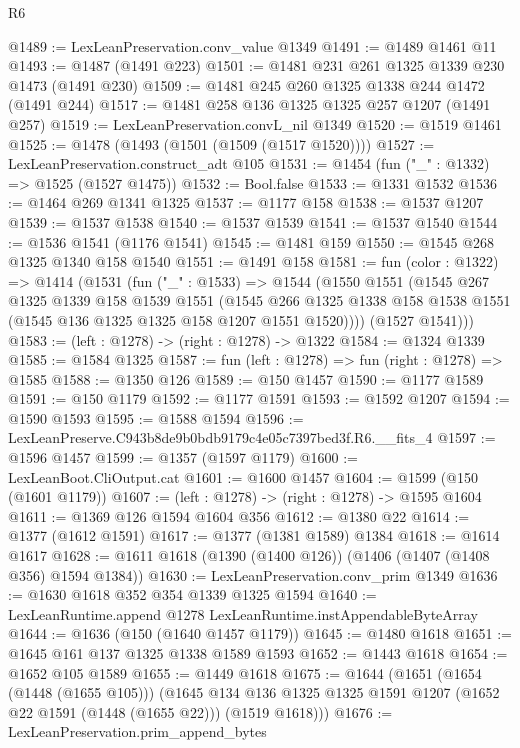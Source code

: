\begin{lexlean}{R6}
\begin{coremodule}
@1489 := LexLeanPreservation.conv_value @1349
@1491 := @1489 @1461 @11
@1493 := @1487 (@1491 @223)
@1501 := @1481 @231 @261 @1325 @1339 @230 @1473 (@1491 @230)
@1509 := @1481 @245 @260 @1325 @1338 @244 @1472 (@1491 @244)
@1517 := @1481 @258 @136 @1325 @1325 @257 @1207 (@1491 @257)
@1519 := LexLeanPreservation.convL_nil @1349
@1520 := @1519 @1461
@1525 := @1478 (@1493 (@1501 (@1509 (@1517 @1520))))
@1527 := LexLeanPreservation.construct_adt @105
@1531 := @1454 (fun ("_" : @1332) => @1525 (@1527 @1475))
@1532 := Bool.false
@1533 := @1331 @1532
@1536 := @1464 @269 @1341 @1325
@1537 := @1177 @158
@1538 := @1537 @1207
@1539 := @1537 @1538
@1540 := @1537 @1539
@1541 := @1537 @1540
@1544 := @1536 @1541 (@1176 @1541)
@1545 := @1481 @159
@1550 := @1545 @268 @1325 @1340 @158 @1540
@1551 := @1491 @158
@1581 := fun (color : @1322) =>
  @1414
    (@1531
      (fun ("_" : @1533) =>
      @1544
        (@1550
          @1551
          (@1545
            @267
            @1325
            @1339
            @158
            @1539
            @1551
            (@1545
              @266
              @1325
              @1338
              @158
              @1538
              @1551
              (@1545 @136 @1325 @1325 @158 @1207 @1551 @1520))))
        (@1527 @1541)))
@1583 := (left : @1278) -> (right : @1278) -> @1322
@1584 := @1324 @1339
@1585 := @1584 @1325
@1587 := fun (left : @1278) => fun (right : @1278) => @1585
@1588 := @1350 @126
@1589 := @150 @1457
@1590 := @1177 @1589
@1591 := @150 @1179
@1592 := @1177 @1591
@1593 := @1592 @1207
@1594 := @1590 @1593
@1595 := @1588 @1594
@1596 := LexLeanPreserve.C943b8de9b0bdb9179c4e05c7397bed3f.R6.__fits_4
@1597 := @1596 @1457
@1599 := @1357 (@1597 @1179)
@1600 := LexLeanBoot.CliOutput.cat
@1601 := @1600 @1457
@1604 := @1599 (@150 (@1601 @1179))
@1607 := (left : @1278) -> (right : @1278) -> @1595 @1604
@1611 := @1369 @126 @1594 @1604 @356
@1612 := @1380 @22
@1614 := @1377 (@1612 @1591)
@1617 := @1377 (@1381 @1589) @1384
@1618 := @1614 @1617
@1628 := @1611 @1618 (@1390 (@1400 @126)) (@1406 (@1407 (@1408 @356) @1594 @1384))
@1630 := LexLeanPreservation.conv_prim @1349
@1636 := @1630 @1618 @352 @354 @1339 @1325 @1594
@1640 := LexLeanRuntime.append @1278 LexLeanRuntime.instAppendableByteArray
@1644 := @1636 (@150 (@1640 @1457 @1179))
@1645 := @1480 @1618
@1651 := @1645 @161 @137 @1325 @1338 @1589 @1593
@1652 := @1443 @1618
@1654 := @1652 @105 @1589
@1655 := @1449 @1618
@1675 := @1644
    (@1651
      (@1654 (@1448 (@1655 @105)))
      (@1645 @134 @136 @1325 @1325 @1591 @1207 (@1652 @22 @1591 (@1448 (@1655 @22))) (@1519 @1618)))
@1676 := LexLeanPreservation.prim_append_bytes

\end{coremodule}
\end{lexlean}

